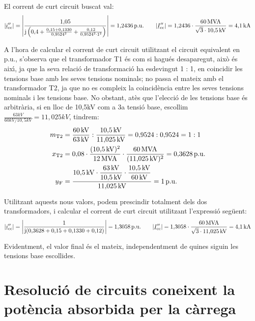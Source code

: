 \begin{exemple}
El corrent de curt circuit buscat val:
\[
|\cmplx{i}''\ped{cc}| = \left| \frac{1{,}05}{\ju \left( 0{,}4 + \frac{0{,}15 + 0{,}1330}{0{,}9524^2} + \frac{0{,}12}{0{,}9524^2 \cdot 1^2} \right)} \right| = 1{,}2436\unit{p.u.} \qquad |\cmplx{I}''\ped{cc}| = 1{,}2436\cdot\frac{60\unit{MVA}}{\sqrt{3}\cdot 10{,}5\unit{kV}} = 4{,}1\unit{kA}
\]

 A l'hora de calcular el corrent de curt circuit utilitzant el circuit equivalent en p.u.,
 s'observa que el transformador T1 \'{e}s com si hagu\'{e}s desaparegut,
 aix\`{o} \'{e}s aix\'{\i}, ja que la seva relaci\'{o} de transformaci\'{o} ha esdevingut
 1 : 1, en coincidir les tensions base amb les seves tensions nominals;
 no passa el mateix amb el transformador T2, ja que no es compleix
 la coincid\`{e}ncia entre les seves tensions nominals i les tensions
 base. No obstant, at\`{e}s que l'elecci\'{o} de les tensions base \'{e}s
 arbitr\`{a}ria, si en lloc de 10,5\unit{kV} com a 3a tensi\'{o} base,
 escollim
 $\frac{63\unit{kV}}{60\unit{kV} / 10{,}5\unit{kV}}=11{,}025\unit{kV}$,
 tindrem:
\begin{align*}
   m\ped{T2} &= \frac{60\unit{kV}}{63\unit{kV}} : \frac{10{,}5\unit{kV}}{11{,}025\unit{kV}}
   = 0{,}9524:0{,}9524 = 1:1 \\
   x\ped{T2} &= 0{,}08 \cdot \frac{(10{,}5\unit{kV})^2}{12\unit{MVA}} \cdot
   \frac{60\unit{MVA}}{(11{,}025\unit{kV})^2}  = 0{,}3628\unit{p.u.}\\
   \cmplx{u}\ped{F} &= \frac{10{,}5\unit{kV} \cdot \dfrac{63\unit{kV}}{10{,}5\unit{kV}} \cdot
   \dfrac{10{,}5\unit{kV}}{60\unit{kV}}}{11{,}025\unit{kV}} = 1\unit{p.u.}
\end{align*}

Utilitzant aquests nous valors, podem prescindir totalment dels dos
transformadors, i calcular el corrent de curt circuit utilitzant
l'expressi\'{o} seg\"{u}ent:
\[
|\cmplx{i}''\ped{cc}| = \left| \frac{1}{\ju ( 0{,}3628 + 0{,}15 +
0{,}1330 + 0{,}12 )} \right| = 1{,}3058\unit{p.u.} \qquad
|\cmplx{I}''\ped{cc}| =
1{,}3058\cdot\frac{60\unit{MVA}}{\sqrt{3}\cdot 11{,}025\unit{kV}} =
4{,}1\unit{kA}
\]

Evidentment, el valor final \'{e}s el mateix, independentment de quines
siguin les tensions base escollides.
\end{exemple}

\section{Resoluci\'{o} de circuits coneixent la pot\`{e}ncia absorbida per la
c\`{a}rrega}\label{sec:EZS}

